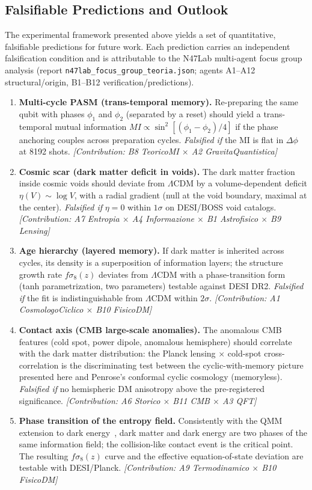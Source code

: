 ﻿\documentclass[12pt,a4paper]{article}
\begin{document}
\subsection{Falsifiable Predictions and Outlook}

The experimental framework presented above yields a set of quantitative, falsifiable predictions for future work. Each prediction carries an independent falsification condition and is attributable to the N47Lab multi-agent focus group analysis (report \texttt{n47lab\_focus\_group\_teoria.json}; agents A1--A12 structural/origin, B1--B12 verification/predictions).

\begin{enumerate}
    \item \textbf{Multi-cycle PASM (trans-temporal memory).} Re-preparing the same qubit with phases $\phi_1$ and $\phi_2$ (separated by a reset) should yield a trans-temporal mutual information $MI \propto \sin^2[(\phi_1-\phi_2)/4]$ if the phase anchoring couples across preparation cycles. \textit{Falsified if} the MI is flat in $\Delta\phi$ at 8192 shots. \textit{[Contribution: B8 TeoricoMI $\times$ A2 GravitaQuantistica]}
    \item \textbf{Cosmic scar (dark matter deficit in voids).} The dark matter fraction inside cosmic voids should deviate from $\Lambda$CDM by a volume-dependent deficit $\eta(V) \sim \log V$, with a radial gradient (null at the void boundary, maximal at the center). \textit{Falsified if} $\eta = 0$ within $1\sigma$ on DESI/BOSS void catalogs. \textit{[Contribution: A7 Entropia $\times$ A4 Informazione $\times$ B1 Astrofisico $\times$ B9 Lensing]}
    \item \textbf{Age hierarchy (layered memory).} If dark matter is inherited across cycles, its density is a superposition of information layers; the structure growth rate $f\sigma_8(z)$ deviates from $\Lambda$CDM with a phase-transition form (tanh parametrization, two parameters) testable against DESI DR2. \textit{Falsified if} the fit is indistinguishable from $\Lambda$CDM within $2\sigma$. \textit{[Contribution: A1 CosmologoCiclico $\times$ B10 FisicoDM]}
    \item \textbf{Contact axis (CMB large-scale anomalies).} The anomalous CMB features (cold spot, power dipole, anomalous hemisphere) should correlate with the dark matter distribution: the Planck lensing $\times$ cold-spot cross-correlation is the discriminating test between the cyclic-with-memory picture presented here and Penrose's conformal cyclic cosmology (memoryless). \textit{Falsified if} no hemispheric DM anisotropy above the pre-registered significance. \textit{[Contribution: A6 Storico $\times$ B11 CMB $\times$ A3 QFT]}
    \item \textbf{Phase transition of the entropy field.} Consistently with the QMM extension to dark energy~\cite{neukart2025de}, dark matter and dark energy are two phases of the same information field; the collision-like contact event is the critical point. The resulting $f\sigma_8(z)$ curve and the effective equation-of-state deviation are testable with DESI/Planck. \textit{[Contribution: A9 Termodinamico $\times$ B10 FisicoDM]}
\end{enumerate}
\end{document}
